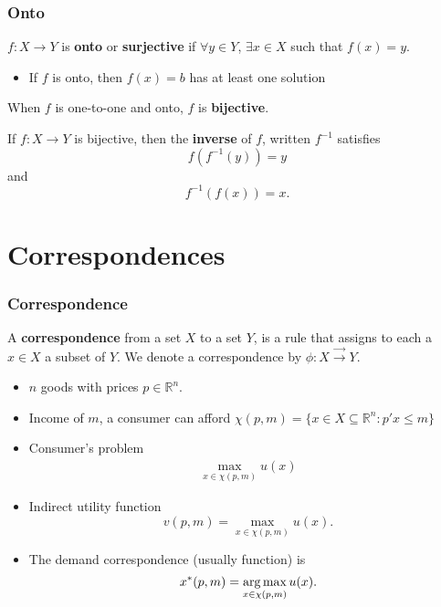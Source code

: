 \documentclass[compress]{beamer}
\newcommand{\argmax}{\operatornamewithlimits{arg\,max}}
\def\R{\mathbb{R}}
\renewcommand{\to}{{\rightarrow}}
\newcommand{\corres}{\overrightarrow{\rightarrow}}
\begin{document}
\begin{frame}
  \frametitle{Onto}
  \begin{definition}
    $f:X \to Y$ is \textbf{onto} or \textbf{surjective} if $\forall y
    \in Y$, $\exists x \in X$ such that $f(x) = y$.
  \end{definition}
  \begin{itemize}
  \item If $f$ is onto, then $f(x) = b$ has at least one solution
  \end{itemize}
  \begin{definition} 
    When $f$ is one-to-one and onto, $f$ is \textbf{bijective}. 
  \end{definition}
  \begin{definition}
    If $f:X \to Y$ is bijective, then the \textbf{inverse} of $f$,
    written $f^{-1}$ satisfies
    \[ f(f^{-1} (y)) = y  \]
    and 
    \[ f^{-1} ( f(x) ) = x. \]
  \end{definition}
\end{frame}

\section{Correspondences}

\begin{frame}\frametitle{Correspondence}
  \begin{definition}
    A \textbf{correspondence} from a set $X$ to a set $Y$, is a rule
    that assigns to each a $x \in X$ a subset of $Y$. We denote a
    correspondence by $\phi: X \corres Y$.
  \end{definition}
\end{frame}

\begin{frame}
  \begin{example}
    \begin{itemize}
    \item $n$ goods with prices $p \in \R^n$. 
    \item Income of $m$, a consumer can afford $\chi(p,m)=\{ x \in X \subseteq
      \R^n: p'x \leq m\}$
    \item Consumer's problem
      \begin{align*}
        \max_{x \in \chi(p,m)} u(x) 
      \end{align*}
    \item Indirect utility function
      \[ v(p,m) = \max_{x \in \chi(p,m)} u(x). \]
    \item The demand correspondence (usually function) is
      \[ x^*(p,m) = \argmax_{x \in \chi(p,m)} u(x). \] 
    \end{itemize}
  \end{example}
\end{frame}
\end{document}

